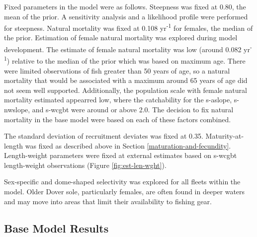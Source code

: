 \documentclass[11pt,
  english,
  a4paper,
]{article}
\begin{document}
Fixed parameters in the model were as follows. Steepness was fixed at 0.80, the mean of the prior. A sensitivity analysis and a likelihood profile were performed for steepness. Natural mortality was fixed at 0.108 yr\textsuperscript{-1} for females, the median of the prior. Estimation of female natural mortality was explored during model development. The estimate of female natural mortality was low (around 0.082 yr\textsuperscript{-1}) relative to the median of the prior which was based on maximum age. There were limited observations of fish greater than 50 years of age, so a natural mortality that would be associated with a maximum around 65 years of age did not seem well supported. Additionally, the population scale with female natural mortality estimated appearred low, where the catchability for the \gls{s-aslope}, \gls{s-nwslope}, and \gls{s-wcgbt} were around or above 2.0. The decision to fix natural mortality in the base model were based on each of these factors combined.

\leavevmode\tagmcend\tagstructend\par


The standard deviation of recruitment deviates was fixed at 0.35. Maturity-at-length was fixed as described above in Section \ref{maturation-and-fecundity}. Length-weight parameters were fixed at external estimates based on \gls{s-wcgbt} length-weight observations (Figure \ref{fig:est-len-wght}).

\leavevmode\tagmcend\tagstructend\par


Sex-specific and dome-shaped selectivity was explored for all fleets within the model. Older Dover sole, particularly females, are often found in deeper waters and may move into areas that limit their availability to fishing gear.

\leavevmode\tagmcend\tagstructend\par


\hypertarget{base-model-results}{%
\subsection{Base Model Results}\label{base-model-results}}

\leavevmode\tagmcend\tagstructend
\end{document}

